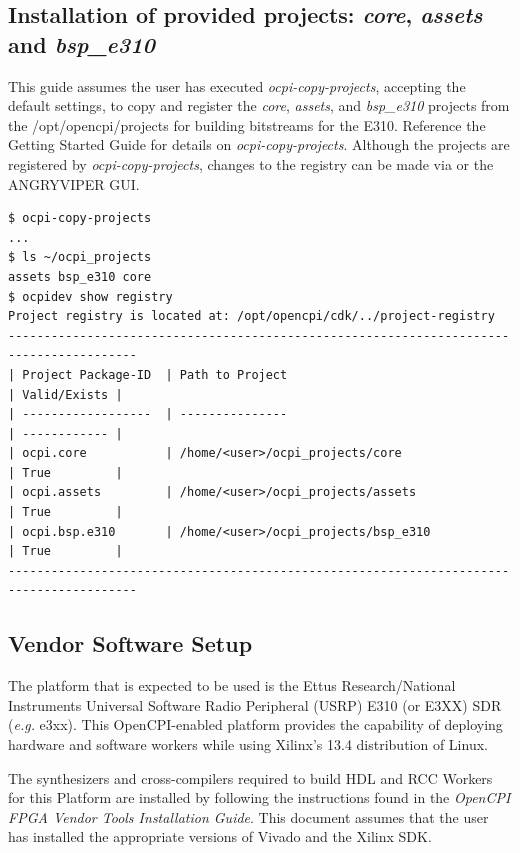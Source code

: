 \begin{flushleft}
	\subsection{Installation of provided projects: \textit{core}, \textit{assets} and \textit{bsp\_e310}}
	This guide  assumes the user has executed \textit{ocpi-copy-projects}, accepting the default settings, to copy and register the \textit{core}, \textit{assets}, and \textit{bsp\_e310} projects from the /opt/opencpi/projects for building bitstreams for the E310. Reference the Getting Started Guide for details on \textit{ocpi-copy-projects}.  Although the projects are registered by \textit{ocpi-copy-projects}, changes to the registry can be made via  or the ANGRYVIPER GUI.\medskip

\begin{verbatim}
$ ocpi-copy-projects
...
$ ls ~/ocpi_projects
assets bsp_e310 core
$ ocpidev show registry
Project registry is located at: /opt/opencpi/cdk/../project-registry
----------------------------------------------------------------------------------------
| Project Package-ID  | Path to Project                                 | Valid/Exists |
| ------------------  | ---------------                                 | ------------ |
| ocpi.core           | /home/<user>/ocpi_projects/core                   | True         |
| ocpi.assets         | /home/<user>/ocpi_projects/assets                 | True         |
| ocpi.bsp.e310       | /home/<user>/ocpi_projects/bsp_e310               | True         |
----------------------------------------------------------------------------------------
\end{verbatim}

\subsection{Vendor Software Setup}
The platform that is expected to be used is the Ettus Research/National Instruments Universal Software Radio Peripheral (USRP) E310 (or E3XX) SDR (\textit{e.g.} e3xx). This OpenCPI-enabled platform provides the capability of deploying hardware and software workers while using Xilinx's 13.4 distribution of Linux.\\ \bigskip

The synthesizers and cross-compilers required to build HDL and RCC Workers for this Platform are installed by following the instructions found in the \textit{OpenCPI FPGA Vendor Tools Installation Guide}. This document assumes that the user has installed the appropriate versions of Vivado and the Xilinx SDK.\\ \bigskip


\end{flushleft}
